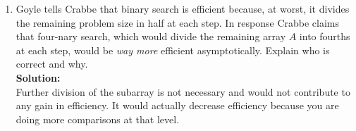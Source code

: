 \documentclass[12pt]{article}
\begin{document}
\begin{enumerate}
\begin{enumerate}
		\item Goyle tells Crabbe that binary search is efficient because, at worst, it divides the remaining problem size in half at each step. In response Crabbe claims that four-nary search, which would divide the remaining array $A$ into fourths at each step, would be \textit{way more} efficient asymptotically. Explain who is correct and why.\\
		{\bf{Solution:}}\\
			Further division of the subarray is not necessary and would not contribute to any gain in efficiency. It would actually
			decrease efficiency because you are doing more comparisons at that level. \\
		\end{enumerate}
	\end{enumerate}
\end{document}
